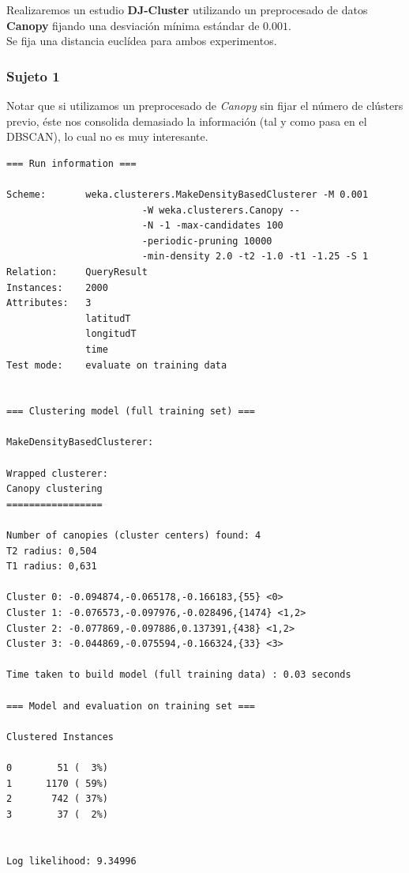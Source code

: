 \documentclass[a4paper, 12pt]{article}
\begin{document}
Realizaremos un estudio \textbf{DJ-Cluster} utilizando un preprocesado de datos \textbf{Canopy} fijando una desviaci\'on m\'inima est\'andar de $0.001$. \\

Se fija una distancia eucl\'idea para ambos experimentos.\\

\subsubsection{Sujeto 1}

Notar que si utilizamos un preprocesado de \textit{Canopy} sin fijar el n\'umero de cl\'usters previo, \'este nos consolida demasiado la informaci\'on (tal y como pasa en el DBSCAN), lo cual no es muy interesante.\\

\begin{verbatim}
=== Run information ===

Scheme:       weka.clusterers.MakeDensityBasedClusterer -M 0.001 
						-W weka.clusterers.Canopy -- 
						-N -1 -max-candidates 100 
						-periodic-pruning 10000 
						-min-density 2.0 -t2 -1.0 -t1 -1.25 -S 1
Relation:     QueryResult
Instances:    2000
Attributes:   3
              latitudT
              longitudT
              time
Test mode:    evaluate on training data


=== Clustering model (full training set) ===

MakeDensityBasedClusterer: 

Wrapped clusterer: 
Canopy clustering
=================

Number of canopies (cluster centers) found: 4
T2 radius: 0,504     
T1 radius: 0,631     

Cluster 0: -0.094874,-0.065178,-0.166183,{55} <0>
Cluster 1: -0.076573,-0.097976,-0.028496,{1474} <1,2>
Cluster 2: -0.077869,-0.097886,0.137391,{438} <1,2>
Cluster 3: -0.044869,-0.075594,-0.166324,{33} <3>

Time taken to build model (full training data) : 0.03 seconds

=== Model and evaluation on training set ===

Clustered Instances

0        51 (  3%)
1      1170 ( 59%)
2       742 ( 37%)
3        37 (  2%)


Log likelihood: 9.34996
\end{verbatim}
\end{document}
